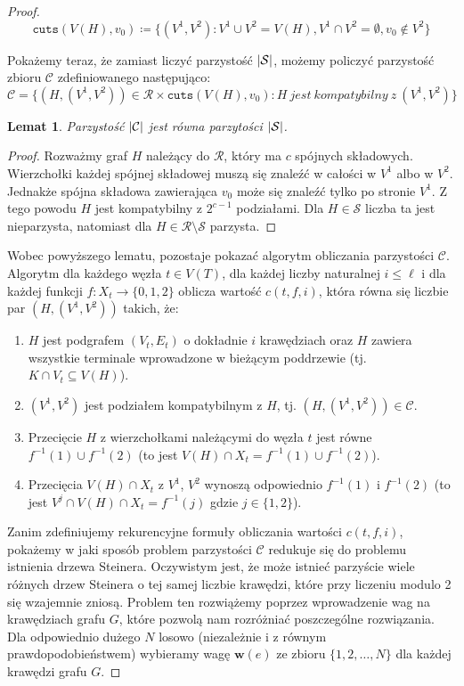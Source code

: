 \documentclass[12pt, oneside]{report}
\newtheorem{lemma}{Lemat}
\begin{document}
\begin{proof}
$$\texttt{cuts} (V(H), v_0) \coloneqq \{(V^1, V^2): V^1 \cup V^2 = V(H), V^1 \cap V^2 = \emptyset, v_0 \notin V^2\}$$

Pokażemy teraz, że zamiast liczyć parzystość $\abs{\mathcal{S}}$, możemy policzyć parzystość zbioru $\mathcal{C}$ zdefiniowanego następująco:
$$\mathcal{C} = \{(H, (V^1, V^2)) \in \mathcal{R} \times \texttt{cuts}(V(H), v_0) : H\ jest\ kompatybilny\ z\ (V^1, V^2)\}$$

\begin{lemma}
Parzystość $\abs{\mathcal{C}}$ jest równa parzytości $\abs{\mathcal{S}}$.
\end{lemma}

\begin{proof}
Rozważmy graf $H$ należący do $\mathcal{R}$, który ma $c$ spójnych składowych. Wierzchołki każdej spójnej składowej muszą się znaleźć w całości w $V^1$ albo w $V^2$. Jednakże spójna składowa zawierająca $v_0$ może się znaleźć tylko po stronie $V^1$. Z tego powodu $H$ jest kompatybilny z $2^{c-1}$ podziałami. Dla $H \in \mathcal{S}$ liczba ta jest nieparzysta, natomiast dla $H \in \mathcal{R} \setminus \mathcal{S}$ parzysta. 
\end{proof}

Wobec powyższego lematu, pozostaje pokazać algorytm obliczania parzystości $\mathcal{C}$. Algorytm dla każdego węzła $t \in V(T)$, dla każdej liczby naturalnej $i \leq \ell$ i dla każdej funkcji $f: X_t \to \{0,1,2\}$ oblicza wartość $c(t, f, i)$, która równa się liczbie par $(H, (V^1, V^2))$ takich, że:

\begin{enumerate}[label=(\roman*)]
\item $H$ jest podgrafem $(V_t, E_t)$ o dokładnie $i$ krawędziach oraz $H$ zawiera wszystkie terminale wprowadzone w bieżącym poddrzewie (tj. $K \cap V_t \subseteq V(H)$).
\item $(V^1, V^2)$ jest podziałem kompatybilnym z $H$, tj. $(H, (V^1, V^2)) \in \mathcal{C}$.
\item Przecięcie $H$ z wierzchołkami należącymi do węzła $t$ jest równe $f^{-1}(1) \cup f^{-1}(2)$ (to jest $V(H) \cap X_t = f^{-1}(1) \cup f^{-1}(2)$).
\item Przecięcia $V(H) \cap X_t$ z $V^1$, $V^2$ wynoszą odpowiednio $f^{-1}(1)$ i $f^{-1}(2)$ (to jest $V^j \cap V(H) \cap X_t = f^{-1}(j)$ gdzie $j \in \{1,2\}$).
\end{enumerate} 

Zanim zdefiniujemy rekurencyjne formuły obliczania wartości $c(t, f, i)$, pokażemy w jaki sposób problem parzystości $\mathcal{C}$ redukuje się do problemu istnienia drzewa Steinera. Oczywistym jest, że może istnieć parzyście wiele różnych drzew Steinera o tej samej liczbie krawędzi, które przy liczeniu modulo 2 się wzajemnie zniosą. Problem ten rozwiążemy poprzez wprowadzenie wag na krawędziach grafu $G$, które pozwolą nam rozróżniać poszczególne rozwiązania. 
Dla odpowiednio dużego $N$ losowo (niezależnie i z równym prawdopodobieństwem) wybieramy wagę $\mathbf{w}(e)$ ze zbioru $\{1,2,\dots,N\}$ dla każdej krawędzi grafu $G$. 


\end{proof}
\end{document}
